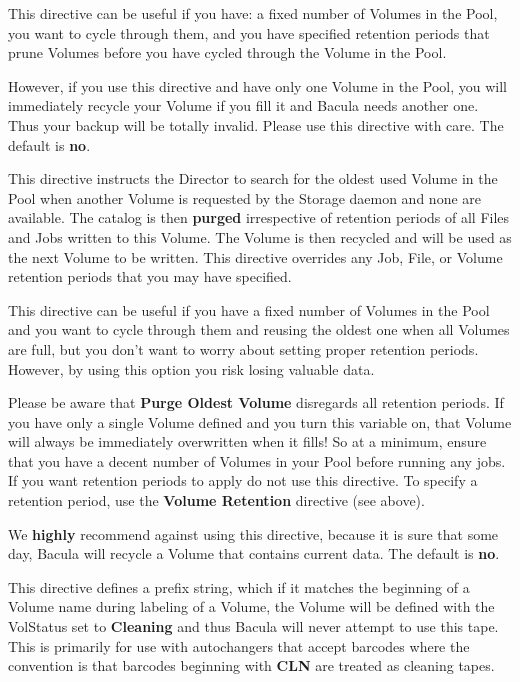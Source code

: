 \begin{description}
   This directive can be useful if you have: a fixed number of Volumes in
   the Pool, you want to cycle through them, and you have specified
   retention periods that prune Volumes before you have cycled through the
   Volume in the Pool.

   However, if you use this directive and have only one Volume in the Pool,
   you will immediately recycle your Volume if you fill it and Bacula needs
   another one.  Thus your backup will be totally invalid.  Please use this
   directive with care.  The default is {\bf no}.

\label{PurgeOldest}

\item [Purge Oldest Volume = \lt{}yes\vb{}no\gt{}]
   This directive instructs the Director to search for the oldest used
   Volume in the Pool when another Volume is requested by the Storage
   daemon and none are available.  The catalog is then {\bf purged}
   irrespective of retention periods of all Files and Jobs written to this
   Volume.  The Volume is then recycled and will be used as the next Volume
   to be written.  This directive overrides any Job, File, or Volume
   retention periods that you may have specified.

   This directive can be useful if you have a fixed number of Volumes in
   the Pool and you want to cycle through them and reusing the oldest one
   when all Volumes are full, but you don't want to worry about setting
   proper retention periods.  However, by using this option you risk losing
   valuable data.

   Please be aware that {\bf Purge Oldest Volume} disregards all retention
   periods. If you have only a single Volume defined and you turn this
   variable on, that Volume will always be immediately overwritten when it
   fills!  So at a minimum, ensure that you have a decent number of Volumes
   in your Pool before running any jobs.  If you want retention periods to
   apply do not use this directive.  To specify a retention period, use the
   {\bf Volume Retention} directive (see above).

   We {\bf highly} recommend against using this directive, because it is
   sure that some day, Bacula will recycle a Volume that contains current
   data.  The default is {\bf no}.

\item [Cleaning Prefix = \lt{}string\gt{}]
   This directive defines a prefix string, which if it matches the
   beginning of a Volume name during labeling of a Volume, the Volume will
   be defined with the VolStatus set to {\bf Cleaning} and thus Bacula will
   never attempt to use this tape.  This is primarily for use with
   autochangers that accept barcodes where the convention is that barcodes
   beginning with {\bf CLN} are treated as cleaning tapes.


\end{description}
